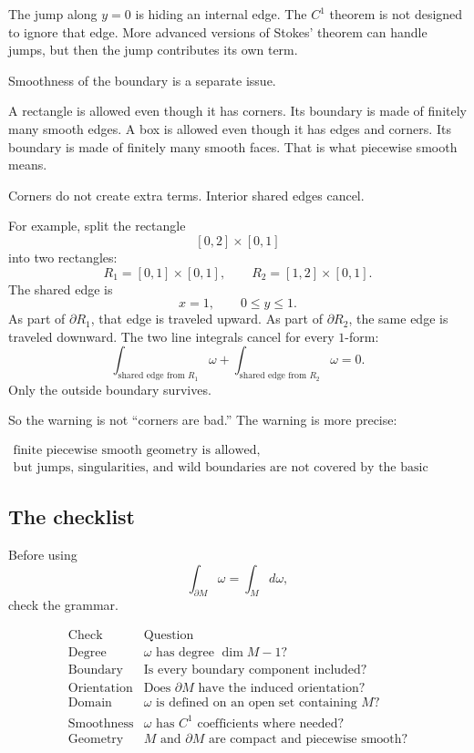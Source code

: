 The jump along \(y=0\) is hiding an internal edge.  The \(C^1\) theorem is not designed
to ignore that edge.  More advanced versions of Stokes' theorem can handle jumps, but
then the jump contributes its own term.

Smoothness of the boundary is a separate issue.

A rectangle is allowed even though it has corners.  Its boundary is made of finitely
many smooth edges.  A box is allowed even though it has edges and corners.  Its
boundary is made of finitely many smooth faces.  That is what piecewise smooth
means.

Corners do not create extra terms.  Interior shared edges cancel.

For example, split the rectangle
\[
    [0,2]\times[0,1]
\]
into two rectangles:
\[
    R_1=[0,1]\times[0,1],
    \qquad
    R_2=[1,2]\times[0,1].
\]
The shared edge is
\[
    x=1,\qquad 0\le y\le1.
\]
As part of \(\partial R_1\), that edge is traveled upward.  As part of \(\partial R_2\),
the same edge is traveled downward.  The two line integrals cancel for every
\(1\)-form:
\[
    \int_{\text{shared edge from }R_1}\omega
    +
    \int_{\text{shared edge from }R_2}\omega
    =
    0.
\]
Only the outside boundary survives.

So the warning is not ``corners are bad.''  The warning is more precise:

\[
\boxed{
\begin{array}{c}
\text{finite piecewise smooth geometry is allowed,}\\[1mm]
\text{but jumps, singularities, and wild boundaries are not covered by the basic theorem.}
\end{array}
}
\]

\subsection{The checklist}

Before using
\[
    \int_{\partial M}\omega=\int_M d\omega,
\]
check the grammar.

\[
\begin{array}{c|l}
\text{Check} & \text{Question} \\ \hline
\text{Degree} &
\omega\text{ has degree }\dim M-1\text{?}\\[1mm]
\text{Boundary} &
\text{Is every boundary component included?}\\[1mm]
\text{Orientation} &
\text{Does }\partial M\text{ have the induced orientation?}\\[1mm]
\text{Domain} &
\omega\text{ is defined on an open set containing }M\text{?}\\[1mm]
\text{Smoothness} &
\omega\text{ has }C^1\text{ coefficients where needed?}\\[1mm]
\text{Geometry} &
M\text{ and }\partial M\text{ are compact and piecewise smooth?}
\end{array}
\]

